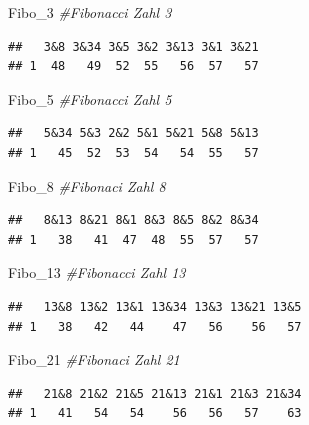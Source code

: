 \documentclass[ngerman,]{article}
\newenvironment{Shaded}{\begin{snugshade}}{\end{snugshade}}
\newcommand{\DecValTok}[1]{\textcolor[rgb]{0.00,0.00,0.81}{#1}}
\newcommand{\CommentTok}[1]{\textcolor[rgb]{0.56,0.35,0.01}{\textit{#1}}}
\newcommand{\NormalTok}[1]{#1}
\begin{document}
\begin{Shaded}
\begin{Highlighting}[]
\NormalTok{Fibo_}\DecValTok{3} \CommentTok{#Fibonacci Zahl 3}
\end{Highlighting}
\end{Shaded}

\begin{verbatim}
##   3&8 3&34 3&5 3&2 3&13 3&1 3&21
## 1  48   49  52  55   56  57   57
\end{verbatim}

\begin{Shaded}
\begin{Highlighting}[]
\NormalTok{Fibo_}\DecValTok{5} \CommentTok{#Fibonacci Zahl 5}
\end{Highlighting}
\end{Shaded}

\begin{verbatim}
##   5&34 5&3 2&2 5&1 5&21 5&8 5&13
## 1   45  52  53  54   54  55   57
\end{verbatim}

\begin{Shaded}
\begin{Highlighting}[]
\NormalTok{Fibo_}\DecValTok{8} \CommentTok{#Fibonaci Zahl 8}
\end{Highlighting}
\end{Shaded}

\begin{verbatim}
##   8&13 8&21 8&1 8&3 8&5 8&2 8&34
## 1   38   41  47  48  55  57   57
\end{verbatim}

\begin{Shaded}
\begin{Highlighting}[]
\NormalTok{Fibo_}\DecValTok{13} \CommentTok{#Fibonacci Zahl 13}
\end{Highlighting}
\end{Shaded}

\begin{verbatim}
##   13&8 13&2 13&1 13&34 13&3 13&21 13&5
## 1   38   42   44    47   56    56   57
\end{verbatim}

\begin{Shaded}
\begin{Highlighting}[]
\NormalTok{Fibo_}\DecValTok{21} \CommentTok{#Fibonaci Zahl 21}
\end{Highlighting}
\end{Shaded}

\begin{verbatim}
##   21&8 21&2 21&5 21&13 21&1 21&3 21&34
## 1   41   54   54    56   56   57    63
\end{verbatim}
\end{document}
